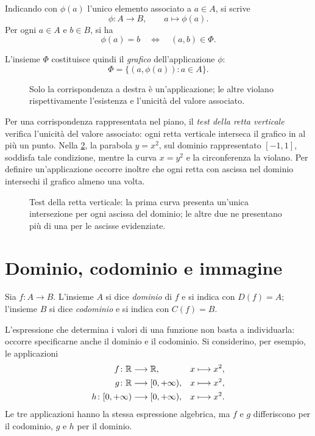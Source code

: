 Indicando con \(\phi(a)\) l'unico elemento associato
a \(a\in A\), si scrive
\[
  \phi\colon A\longrightarrow B,
  \qquad a\longmapsto\phi(a).
\]
Per ogni \(a\in A\) e \(b\in B\), si ha
\[
  \phi(a)=b
  \quad\Longleftrightarrow\quad
  (a,b)\in\Phi.
\]

L'insieme \(\Phi\) costituisce quindi il
\emph{grafico} dell'applicazione \(\phi\):
\[
  \Phi=\{(a,\phi(a)):a\in A\}.
\]

\begin{figure}[htbp]
  \centering
  
  \caption{Solo la corrispondenza a destra è
  un'applicazione; le altre violano rispettivamente
  l'esistenza e l'unicità del valore associato.}
  \label{fig:lez06-relazioni}
\end{figure}

Per una corrispondenza rappresentata nel piano,
il \emph{test della retta verticale} verifica
l'unicità del valore associato: ogni retta verticale
interseca il grafico in al più un punto. Nella
\cref{fig:lez06-test-verticale}, la parabola
\(y=x^2\), sul dominio rappresentato \([-1,1]\),
soddisfa tale condizione, mentre la curva
\(x=y^2\) e la circonferenza la violano.
Per definire un'applicazione occorre inoltre
che ogni retta con ascissa nel dominio
intersechi il grafico almeno una volta.

\begin{figure}[htbp]
  \centering
  
  \caption{Test della retta verticale: la prima
  curva presenta un'unica intersezione per ogni
  ascissa del dominio; le altre due ne presentano
  più di una per le ascisse evidenziate.}
  \label{fig:lez06-test-verticale}
\end{figure}

\clearpage

\section{Dominio, codominio e immagine}
\label{sec:lez06-dominio-immagine}

\begin{definition}
\label{def:lez06-dominio-codominio}
Sia \(f\colon A\longrightarrow B\). L'insieme
\(A\) si dice \emph{dominio} di \(f\) e si indica
con \(D(f)=A\); l'insieme \(B\) si dice
\emph{codominio} e si indica con \(C(f)=B\).
\end{definition}

L'espressione che determina i valori di una
funzione non basta a individuarla: occorre
specificarne anche il dominio e il codominio.
Si considerino, per esempio, le applicazioni
\[
  \begin{aligned}
    f\colon\mathbb{R}&\longrightarrow\mathbb{R},
      &x&\longmapsto x^2,\\
    g\colon\mathbb{R}&\longrightarrow[0,+\infty),
      &x&\longmapsto x^2,\\
    h\colon[0,+\infty)&\longrightarrow[0,+\infty),
      &x&\longmapsto x^2.
  \end{aligned}
\]
Le tre applicazioni hanno la stessa espressione
algebrica, ma \(f\) e \(g\) differiscono per il codominio,
\(g\) e \(h\) per il dominio.

